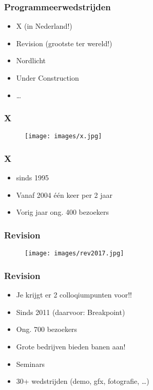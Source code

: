 \documentclass[aspectratio=43]{uva-inf-presentation}
\begin{document}
\begin{frame}
\frametitle{Programmeerwedstrijden}

\begin{itemize}
\item X (in Nederland!)
\item Revision (grootste ter wereld!)
\item Nordlicht
\item Under Construction
\item \dots
\end{itemize}

\end{frame}


\begin{frame}
\frametitle{X}

\begin{figure}
\texttt{[image: images/x.jpg]}
\end{figure}

\end{frame}


\begin{frame}
\frametitle{X}

\begin{itemize}
\item sinds 1995
\item Vanaf 2004 \'e\'en keer per 2 jaar
\item Vorig jaar ong. 400 bezoekers
\end{itemize}

\end{frame}


\begin{frame}
\frametitle{Revision}

\begin{figure}
\texttt{[image: images/rev2017.jpg]}
\end{figure}

\end{frame}


\begin{frame}
\frametitle{Revision}

\begin{itemize}
\item Je krijgt er 2 colloqiumpunten voor!!
\item Sinds 2011 (daarvoor: Breakpoint)
\item Ong. 700 bezoekers
\item Grote bedrijven bieden banen aan!
\item Seminars
\item 30+ wedstrijden (demo, gfx, fotografie, \dots)
\end{itemize}
\end{frame}
\end{document}
